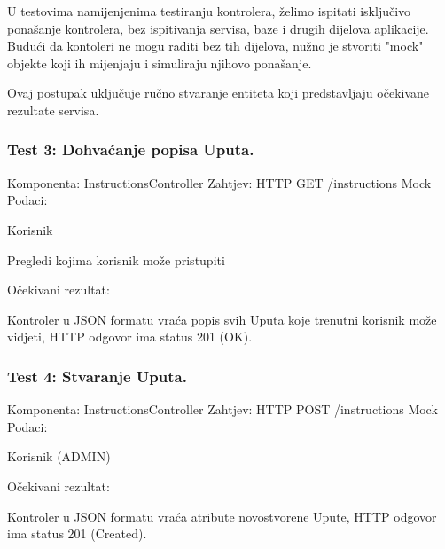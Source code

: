 			U testovima namijenjenima testiranju kontrolera, želimo ispitati isključivo ponašanje kontrolera, bez ispitivanja servisa, baze i drugih dijelova aplikacije.
			Budući da kontoleri ne mogu raditi bez tih dijelova, nužno je stvoriti "mock" objekte koji ih mijenjaju i simuliraju njihovo ponašanje.

			Ovaj postupak uključuje ručno stvaranje entiteta koji predstavljaju očekivane rezultate servisa.

			\subsubsection*{Test 3: Dohvaćanje popisa Uputa.}
			Komponenta: InstructionsController \newline
			Zahtjev: HTTP GET /instructions \newline
			Mock Podaci:
			\begin{packed_item}
				\item Korisnik
				\item Pregledi kojima korisnik može pristupiti
			\end{packed_item}
			Očekivani rezultat:
			\begin{packed_item}
				\item Kontroler u JSON formatu vraća popis svih Uputa koje trenutni korisnik može vidjeti, HTTP odgovor ima status 201 (OK).
			\end{packed_item}
			
			
			\subsubsection*{Test 4: Stvaranje Uputa.}
			Komponenta: InstructionsController \newline
			Zahtjev: HTTP POST /instructions \newline
			Mock Podaci:
			\begin{packed_item}
				\item Korisnik (ADMIN)
			\end{packed_item}
			Očekivani rezultat:
			\begin{packed_item}
				\item Kontroler u JSON formatu vraća atribute novostvorene Upute, HTTP odgovor ima status 201 (Created).
			\end{packed_item}
			

